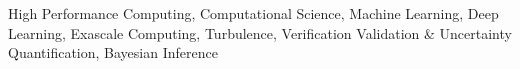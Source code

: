 

High Performance Computing, Computational Science, Machine Learning, Deep Learning,
Exascale Computing, Turbulence, Verification Validation \& Uncertainty Quantification,
Bayesian Inference

